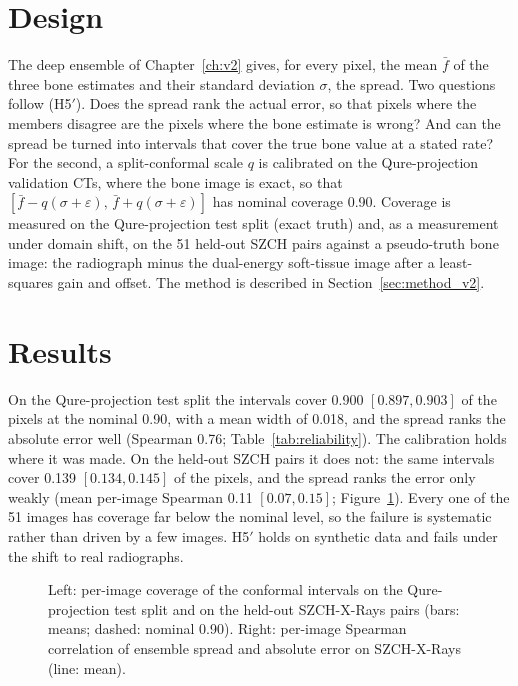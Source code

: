 \section{Design}
The deep ensemble of Chapter~\ref{ch:v2} gives, for every pixel, the mean $\bar f$ of the three bone estimates and their standard deviation
$\sigma$, the spread. Two questions follow (H5$'$). Does the spread rank the actual error, so that pixels where the members disagree are the
pixels where the bone estimate is wrong? And can the spread be turned into intervals that cover the true bone value at a stated rate? For the
second, a split-conformal scale $q$ is calibrated on the Qure-projection validation CTs, where the bone image is exact, so that
$[\bar f-q(\sigma+\varepsilon),\,\bar f+q(\sigma+\varepsilon)]$ has nominal coverage 0.90. Coverage is measured on the Qure-projection test
split (exact truth) and, as a measurement under domain shift, on the 51 held-out SZCH pairs against a pseudo-truth bone image: the radiograph
minus the dual-energy soft-tissue image after a least-squares gain and offset. The method is described in Section~\ref{sec:method_v2}.

\section{Results}
On the Qure-projection test split the intervals cover 0.900 $[0.897,0.903]$ of the pixels at the nominal 0.90, with a mean width of 0.018, and
the spread ranks the absolute error well (Spearman 0.76; Table~\ref{tab:reliability}). The calibration holds where it was made. On the held-out
SZCH pairs it does not: the same intervals cover 0.139 $[0.134,0.145]$ of the pixels, and the spread ranks the error only weakly (mean
per-image Spearman 0.11 $[0.07,0.15]$; Figure~\ref{fig:reliability}). Every one of the 51 images has coverage far below the nominal level, so
the failure is systematic rather than driven by a few images. H5$'$ holds on synthetic data and fails under the shift to real radiographs.
\begin{table}[htbp]
\centering\small
\caption{Ensemble spread and split-conformal intervals ($K=3$, nominal coverage 0.90), with image-bootstrap intervals.}
\label{tab:reliability}
\end{table}
\begin{figure}[htbp]
\centering
{}
\caption{Left: per-image coverage of the conformal intervals on the Qure-projection test split and on the held-out SZCH-X-Rays pairs (bars:
means; dashed: nominal 0.90). Right: per-image Spearman correlation of ensemble spread and absolute error on SZCH-X-Rays (line: mean).}
\label{fig:reliability}
\end{figure}

